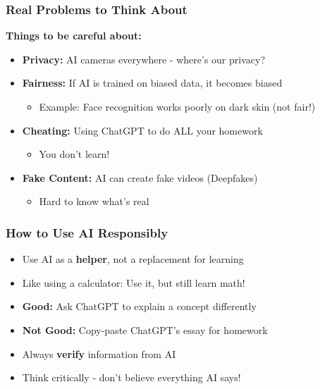 \begin{frame}[fragile]\frametitle{Real Problems to Think About}

{\bf Things to be careful about:}
\begin{itemize}
\item {\bf Privacy:} AI cameras everywhere - where's our privacy?
\item {\bf Fairness:} If AI is trained on biased data, it becomes biased
\begin{itemize}
\item Example: Face recognition works poorly on dark skin (not fair!)
\end{itemize}
\item {\bf Cheating:} Using ChatGPT to do ALL your homework
\begin{itemize}
\item You don't learn!
\end{itemize}
\item {\bf Fake Content:} AI can create fake videos (Deepfakes)
\begin{itemize}
\item Hard to know what's real
\end{itemize}
\end{itemize}
\end{frame}

\begin{frame}[fragile]\frametitle{How to Use AI Responsibly}
\begin{itemize}
\item Use AI as a {\bf helper}, not a replacement for learning
\item Like using a calculator: Use it, but still learn math!
\item {\bf Good:} Ask ChatGPT to explain a concept differently
\item {\bf Not Good:} Copy-paste ChatGPT's essay for homework
\item Always {\bf verify} information from AI
\item Think critically - don't believe everything AI says!
\end{itemize}
\end{frame}

